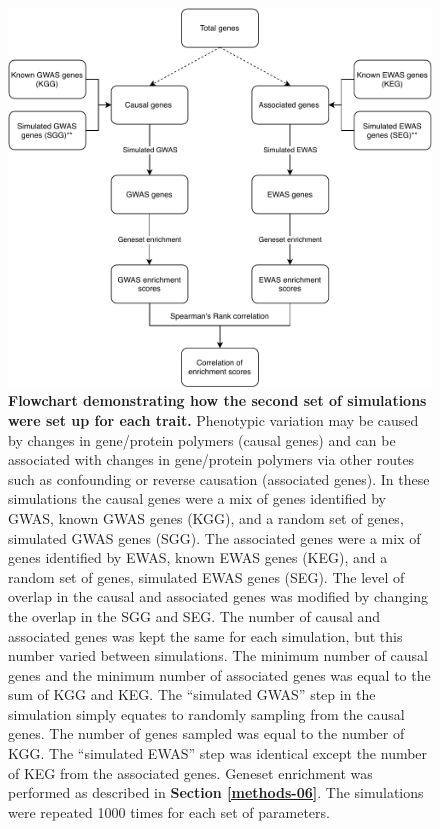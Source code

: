 \documentclass[11pt,oneside]{bristolthesis}
\begin{document}
\begin{figure}

{\centering \includegraphics[width=1\linewidth]{figure/06-ewas_gwas_comparison/architecture-simulations-schematic} 

}

\caption[Flowchart demonstrating how the second set of simulations were set up for each trait]{\textbf{Flowchart demonstrating how the second set of simulations were set up for each trait.} Phenotypic variation may be caused by changes in gene/protein polymers (causal genes) and can be associated with changes in gene/protein polymers via other routes such as confounding or reverse causation (associated genes). In these simulations the causal genes were a mix of genes identified by GWAS, known GWAS genes (KGG), and a random set of genes, simulated GWAS genes (SGG). The associated genes were a mix of genes identified by EWAS, known EWAS genes (KEG), and a random set of genes, simulated EWAS genes (SEG). The level of overlap in the causal and associated genes was modified by changing the overlap in the SGG and SEG. The number of causal and associated genes was kept the same for each simulation, but this number varied between simulations. The minimum number of causal genes and the minimum number of associated genes was equal to the sum of KGG and KEG. The ``simulated GWAS'' step in the simulation simply equates to randomly sampling from the causal genes. The number of genes sampled was equal to the number of KGG. The ``simulated EWAS'' step was identical except the number of KEG from the associated genes. Geneset enrichment was performed as described in \textbf{Section \ref{methods-06}}. The simulations were repeated 1000 times for each set of parameters.}\label{fig:arch-simulations-schematic}
\end{figure}
\end{document}
